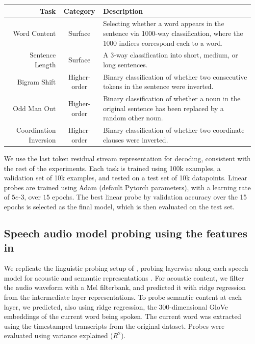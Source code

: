 \documentclass{article}
\theoremstyle{plain}
\theoremstyle{definition}
\theoremstyle{remark}
\begin{document}
\begin{table}[h!]
\centering 
\begin{tabular}{r|c|p{8cm}}
       Task & Category & Description \\
       \hline
    Word Content & Surface & Selecting whether a word appears in the sentence via 1000-way classification, where the 1000 indices correspond each to a word. \\ 
    Sentence Length & Surface & A 3-way classification into short, medium, or long sentences.  \\
    \hline 
    Bigram Shift & Higher-order & Binary classification of whether two consecutive tokens in the sentence were inverted. \\
    Odd Man Out & Higher-order & Binary classification of whether a noun in the original sentence has been replaced by a random other noun. \\
    Coordination Inversion & Higher-order & Binary classification of whether two coordinate clauses were inverted. 
\end{tabular}
\end{table}

We use the last token residual stream representation for decoding, consistent with the rest of the experiments. Each task is trained using 100k examples, a validation set of 10k examples, and tested on a test set of 10k datapoints. Linear probes are trained using Adam (default Pytorch parameters), with a learning rate of $5e$-$3$, over $15$ epochs. The best linear probe by validation accuracy over the 15 epochs is selected as the final model, which is then evaluated on the test set.

\subsection{Speech audio model probing using the features in \citet{vattikonda2025brainwavlmfinetuningspeechrepresentations}}
We replicate the linguistic probing setup of \citet{vattikonda2025brainwavlmfinetuningspeechrepresentations}, probing layerwise along each speech model for acoustic and semantic representations \citep{pasad2021layerwise, vaidya2022self}. For acoustic content, we filter the audio waveform with a Mel filterbank, and predicted it with ridge regression from the intermediate layer representations. To probe semantic content at each layer, we predicted, also using ridge regression, the 300-dimensional GloVe embeddings \citep{pennington2014glove} of the current word being spoken. The current word was extracted using the timestamped transcripts from the original \citet{LeBel_Wagner_Jain_Adhikari-Desai_Gupta_Morgenthal_Tang_Xu_Huth_2023} dataset. Probes were evaluated using variance explained ($R^2$).
\end{document}
